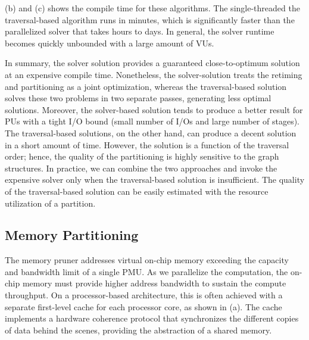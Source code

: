  (b) and (c) shows the compile time for these algorithms. The single-threaded
the traversal-based algorithm runs in minutes, which is significantly faster than the parallelized solver that takes hours to days.
In general, the solver runtime becomes quickly unbounded with a large amount of VUs.

In summary, the solver solution provides a guaranteed close-to-optimum solution at an expensive
compile time. Nonetheless, the solver-solution treats the retiming and partitioning as a joint optimization,
whereas the traversal-based solution solves these two problems in two separate passes,
generating less optimal solutions.
Moreover, the solver-based solution tends to produce a better result for PUs with a tight I/O
bound (small number of I/Os and large number of stages).
The traversal-based solutions, on the other hand, can produce a decent solution in a short amount of
time.
However, the solution is a function of the traversal order; hence, the quality of the partitioning
is highly sensitive to the graph structures.
In practice, we can combine the two approaches and invoke the expensive solver only when the
traversal-based solution is insufficient. The quality of the traversal-based solution can be easily
estimated with the resource utilization of a partition.

\subsection{Memory Partitioning} \label{sec:memsplit}
The memory pruner addresses virtual on-chip memory exceeding the capacity and bandwidth limit of a
single PMU.
As we parallelize the computation, the on-chip memory must provide higher address bandwidth to sustain the
compute throughput.
On a processor-based architecture, this is often achieved with a separate first-level
cache for each processor core, as shown in  (a).
The cache implements a hardware coherence protocol that synchronizes the different copies of data
behind the scenes,
providing the abstraction of a shared memory.

